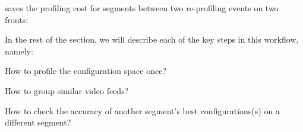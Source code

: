 \name saves the profiling cost for segments between two 
re-profiling events on two fronts:


In the rest of the section, we will describe each of the key steps in 
this workflow, namely:
\begin{packedenumerate}
\item How to profile the configuration space once?
\item How to group similar video feeds?
\item How to check the accuracy of another segment's best 
configurations(s) on a different segment?
\end{packedenumerate} 

